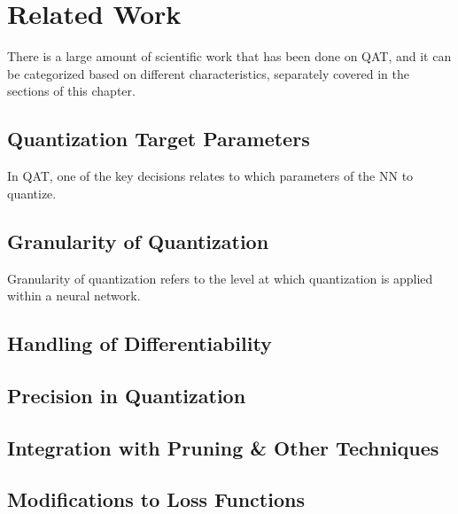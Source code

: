 \chapter{Related Work\label{cha:chapter5}}

There is a large amount of scientific work that has been done on QAT, 
and it can be categorized based on different characteristics, 
separately covered in the sections of this chapter.


\section{Quantization Target Parameters}
In QAT, one of the key decisions relates to which parameters of the NN to quantize.
\section{Granularity of Quantization}
Granularity of quantization refers to the level at which quantization is applied within a neural network.


\section{Handling of Differentiability}
\section{Precision in Quantization}
\section{Integration with Pruning \& Other Techniques}
\section{Modifications to Loss Functions}

